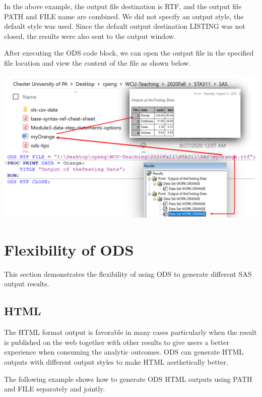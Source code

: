 \documentclass[
]{book}
\begin{document}
In the above example, the output file destination is RTF, and the output file PATH and FILE name are combined. We did not specify an output style, the default style was used. Since the default output destination LISTING was not closed, the results were also sent to the output window.

After executing the ODS code block, we can open the output file in the specified file location and view the content of the file as shown below.

\begin{center}\includegraphics[width=1\linewidth]{img12/w12-output-file-location} \end{center}

\hypertarget{flexibility-of-ods}{%
\section{Flexibility of ODS}\label{flexibility-of-ods}}

This section demonstrates the flexibility of using ODS to generate different SAS output results.

\hypertarget{html}{%
\subsection{HTML}\label{html}}

The HTML format output is favorable in many cases particularly when the result is published on the web together with other results to give users a better experience when consuming the analytic outcomes. ODS can generate HTML outputs with different output styles to make HTML aesthetically better.

The following example shows how to generate ODS HTML outputs using PATH and FILE separately and jointly.
\end{document}
